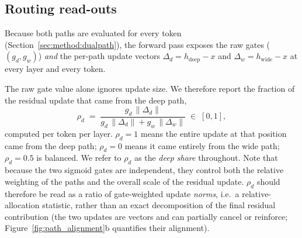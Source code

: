 \documentclass[11pt]{article}
\newcommand{\rev}[1]{{\color{red}#1}}
\begin{document}

\subsection{Routing read-outs}
\label{sec:method:readouts}
 
Because both paths are evaluated for every token
(Section~\ref{sec:method:dualpath}), the forward pass exposes the
raw gates ($(g_d, g_w)$) \emph{and} the per-path update vectors
$\Delta_d = h_{\text{deep}} - x$ and
$\Delta_w = h_{\text{wide}} - x$ at every layer and every token.

The raw gate value alone ignores update size. We therefore report the fraction of the residual update that came from the deep path,
\begin{equation}
\label{eq:deep-share}
\rho_d \;=\; \frac{g_d\,\|\Delta_d\|}{g_d\,\|\Delta_d\| + g_w\,\|\Delta_w\|}
\;\in\; [0,1],
\end{equation}
computed per token per layer. $\rho_d = 1$ means the entire
update at that position came from the deep path; $\rho_d = 0$
means it came entirely from the wide path; $\rho_d = 0.5$ is
balanced. We refer to $\rho_d$ as the \emph{deep share} throughout.
\rev{Note that because the two sigmoid gates are independent, they control
both the relative weighting of the paths and the overall scale of
the residual update. $\rho_d$ should therefore be read as a ratio of
gate-weighted update \emph{norms}, i.e.\ a relative-allocation
statistic, rather than an exact decomposition of the final residual
contribution (the two updates are vectors and can partially cancel
or reinforce; Figure~\ref{fig:path_alignment}b quantifies their
alignment).}
 
\end{document}
